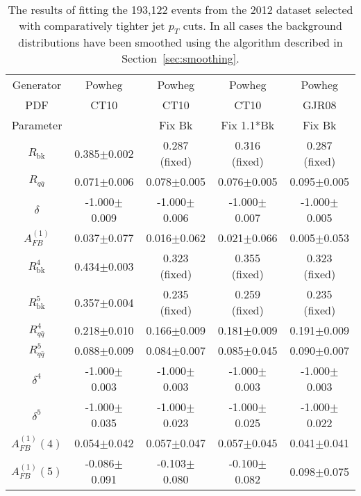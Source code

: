 \documentclass{cmspaperpdf}
\begin{document}
\begin{table}[hbt]
\begin{center}
\caption{\small \label{tab:hard_jet_cuts_data} The results of fitting the 193,122 events from the 2012 dataset selected with comparatively tighter jet $p_{T}$ cuts. In all cases the background distributions have been smoothed using the algorithm described in Section~\ref{sec:smoothing}.}
\vspace{3pt}
\begin{tabular}{|c|c|c|c|c|}\hline
Generator          & Powheg           & Powheg           & Powheg            & Powheg           \\
   PDF             & CT10             & CT10             & CT10              & GJR08            \\
Parameter          &                  & Fix Bk           & Fix 1.1*Bk        & Fix Bk           \\ 
\hline
$R_\mathrm{bk}$    & 0.385$\pm$0.002  & 0.287 (fixed)    & 0.316 (fixed)     & 0.287 (fixed)    \\ 
$R_{q\bar q}$      & 0.071$\pm$0.006  & 0.078$\pm$0.005  & 0.076$\pm$0.005   & 0.095$\pm$0.005  \\ 
$\delta$           & -1.000$\pm$0.009 & -1.000$\pm$0.006 & -1.000$\pm$0.007  & -1.000$\pm$0.005 \\ 
$A^{(1)}_{FB}$     & 0.037$\pm$0.077  & 0.016$\pm$0.062  & 0.021$\pm$0.066   & 0.005$\pm$0.053  \\ 
\hline
$R^4_\mathrm{bk}$  & 0.434$\pm$0.003  & 0.323 (fixed)    & 0.355 (fixed)     & 0.323 (fixed)    \\ 
$R^5_\mathrm{bk}$  & 0.357$\pm$0.004  & 0.235 (fixed)    & 0.259 (fixed)     & 0.235 (fixed)    \\ 
$R^4_{q\bar q}$    & 0.218$\pm$0.010  & 0.166$\pm$0.009  & 0.181$\pm$0.009   & 0.191$\pm$0.009  \\ 
$R^5_{q\bar q}$    & 0.088$\pm$0.009  & 0.084$\pm$0.007  & 0.085$\pm$0.045   & 0.090$\pm$0.007  \\ 
$\delta^4$         & -1.000$\pm$0.003 & -1.000$\pm$0.003 & -1.000$\pm$0.003  & -1.000$\pm$0.003 \\ 
$\delta^5$         & -1.000$\pm$0.035 & -1.000$\pm$0.023 & -1.000$\pm$0.025  & -1.000$\pm$0.022 \\ 
$A^{(1)}_{FB}(4)$  & 0.054$\pm$0.042  & 0.057$\pm$0.047  & 0.057$\pm$0.045   & 0.041$\pm$0.041  \\
$A^{(1)}_{FB}(5)$  & -0.086$\pm$0.091 & -0.103$\pm$0.080 & -0.100$\pm$0.082  & 0.098$\pm$0.075  \\
\hline
\end{tabular}
\end{center}
\end{table}
\end{document}
